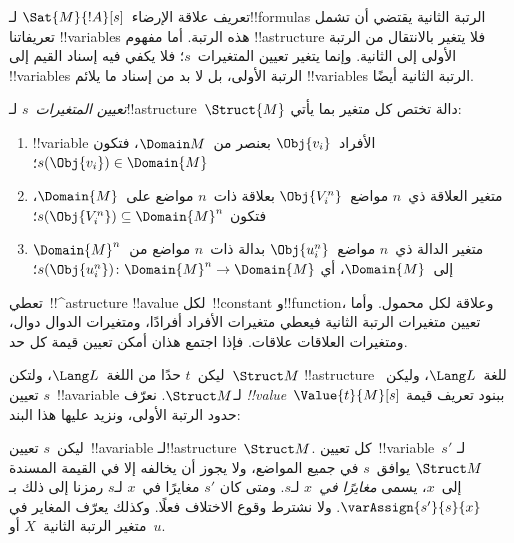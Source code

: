 \documentclass[../../../include/open-logic-section]{subfiles}
\begin{document}


\begin{explain}
تعريف علاقة الإرضاء~$\Sat{M}{!A}[s]$ لـ!!{formula}s الرتبة الثانية
يقتضي أن تشمل تعريفاتنا !!{variable}s هذه الرتبة. أما مفهوم
!!a{structure} فلا يتغير بالانتقال من الرتبة الأولى إلى الثانية.
وإنما يتغير تعيين المتغيرات~$s$؛ فلا يكفي فيه إسناد القيم إلى
!!{variable}s الرتبة الأولى، بل لا بد من إسناد ما يلائم
!!{variable}s الرتبة الثانية أيضًا.
\end{explain}

\begin{defn}
\emph{تعيين المتغيرات}~$s$ لـ!!a{structure}~$\Struct{M}$ دالة
تختص كل متغير بما يأتي:
\begin{enumerate}
\item !!{variable} الأفراد~$\Obj{v_i}$ بعنصر من~$\Domain M$، فتكون
  $s(\Obj{v_i}) \in \Domain{M}$؛
\item متغير العلاقة ذي~$n$ مواضع~$\Obj{V_i^n}$ بعلاقة ذات~$n$
  مواضع على~$\Domain{M}$، فتكون
  $s(\Obj{V_i^n}) \subseteq \Domain{M}^n$؛
\item متغير الدالة ذي~$n$ مواضع~$\Obj{u_i^n}$ بدالة ذات~$n$ مواضع
  من~$\Domain{M}^n$ إلى~$\Domain{M}$، أي
  $s(\Obj{u_i^n})\colon \Domain{M}^n \to \Domain{M}$؛
\end{enumerate}
\end{defn}

\begin{explain}
تعطي~!!^a{structure} !!a{value} لكل~!!{constant} و!!{function}،
وعلاقة لكل محمول. وأما تعيين متغيرات الرتبة الثانية فيعطي متغيرات
الأفراد أفرادًا، ومتغيرات الدوال دوال، ومتغيرات العلاقات علاقات.
فإذا اجتمع هذان أمكن تعيين قيمة كل حد.
\end{explain}

\begin{defn}
ليكن~$t$ حدًا من اللغة~$\Lang L$، ولتكن~$\Struct M$
!!a{structure} للغة~$\Lang L$، وليكن~$s$ تعيين~!!a{variable}
لـ$\Struct M$. نعرّف \emph{!!{value}}~$\Value{t}{M}[s]$ ببنود
تعريف قيمة حدود الرتبة الأولى، ونزيد عليها هذا البند:
\begin{quote}
\end{quote}
\end{defn}

\begin{defn}[المغاير في~$x$]
ليكن~$s$ تعيين~!!a{variable} لـ!!a{structure}~$\Struct M$.
كل تعيين~!!{variable}~$s'$ لـ$\Struct M$ يوافق~$s$ في جميع
المواضع، ولا يجوز أن يخالفه إلا في القيمة المسندة إلى~$x$، يسمى
\emph{مغايرًا في~$x$} لـ$s$. ومتى كان
$s'$ مغايرًا في~$x$ لـ$s$ رمزنا إلى ذلك
بـ$\varAssign{s'}{s}{x}$. ولا نشترط وقوع الاختلاف فعلًا.
وكذلك يعرّف المغاير في متغير الرتبة الثانية~$X$ أو~$u$.
\end{defn}
\end{document}
